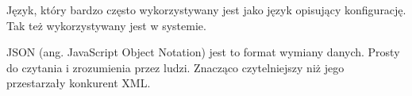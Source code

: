 Język, który bardzo często wykorzystywany jest jako język opisujący konfigurację. Tak też wykorzystywany jest w systemie.  

JSON (ang. JavaScript Object Notation) jest to format wymiany danych. Prosty do czytania i zrozumienia przez ludzi. Znacząco czytelniejszy niż jego przestarzały konkurent XML.
